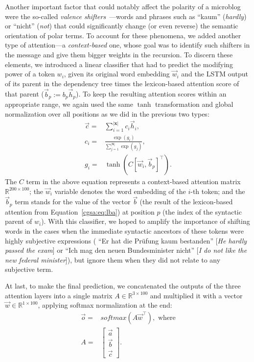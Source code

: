 Another important factor that could notably affect the polarity of a
microblog were the so-called \emph{valence
  shifters}~\cite[][]{Polanyi:06}---words and phrases such as ``kaum''
(\emph{hardly}) or ``nicht'' (\emph{not}) that could significantly
change (or even reverse) the semantic orientation of polar terms.  To
account for these phenomena, we added another type of attention---a
\emph{context-based} one, whose goal was to identify such shifters in
the message and give them bigger weights in the recursion.  To discern
these elements, we introduced a linear classifier that had to predict
the modifying power of a token $w_i$, given its original word
embedding $\vec{w}_i$ and the LSTM output of its parent in the
dependency tree times the lexicon-based attention score of that parent
($\vec{b}_p := b_p\vec{h}_p$).  To keep the resulting attention scores
within an appropriate range, we again used the same $\tanh$
transformation and global normalization over all positions as we did
in the previous two types:
\begin{align*}
  \vec{c} =& \sum_{i=1}^{|\mathbf{x}|}c_i\vec{h}_i,\\ c_i =&
  \frac{\exp(g_i)}{\sum_{j=1}^{|\mathbf{x}|}\exp(g_j)},\\ g_i =&
  \tanh\left(C [\vec{w}_i, \vec{b}_p]^{\top}\right).
\end{align*}
The $C$ term in the above equation represents a context-based
attention matrix $\mathbb{R}^{200 \times 100}$; the $\vec{w}_i$
variable denotes the word embedding of the $i$-th token; and the
$\vec{b}_p$ term stands for the value of the vector $\vec{b}$ (the
result of the lexicon-based attention from Equation~\ref{cgsa:eq:lba})
at position $p$ (the index of the syntactic parent of $w_i$).  With
this classifier, we hoped to amplify the importance of shifting words
in the cases when the immediate syntactic ancestors of these tokens
were highly subjective expressions (\eg{} ``Er hat die Pr\"ufung kaum
bestanden'' [\emph{He hardly passed the exam}] or ``Ich mag den neuen
Bundesminister nicht'' [\emph{I do not like the new federal
    minister}]), but ignore them when they did not relate to any
subjective term.

At last, to make the final prediction, we concatenated the outputs of
the three attention layers into a single matrix $A\in\mathbb{R}^{3
  \times 100}$ and multiplied it with a vector
$\vec{w}\in\mathbb{R}^{1\times{}100}$, applying softmax normalization
at the end:
\begin{align*}
  \vec{o} =& softmax\left(A\vec{w}^\top\right),\textrm{ where}\\
  A =& \begin{bmatrix}
    \vec{a}\\
    \vec{b}\\
    \vec{c}\end{bmatrix}.
\end{align*}

